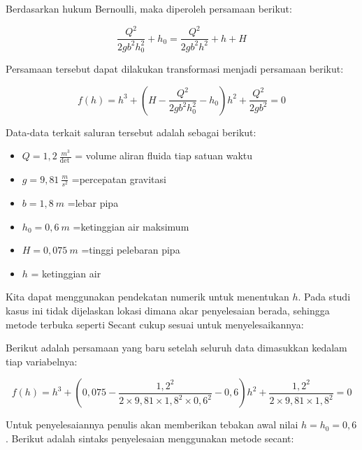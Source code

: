 \documentclass[]{book}
\providecommand{\tightlist}{%
  \setlength{\itemsep}{0pt}\setlength{\parskip}{0pt}}
\theoremstyle{definition}
\theoremstyle{definition}
\theoremstyle{definition}
\theoremstyle{remark}
\begin{document}
Berdasarkan hukum Bernoulli, maka diperoleh persamaan berikut:

\begin{equation}
\frac{Q^2}{2gb^2h_0^2}+h_0=\frac{Q^2}{2gb^2h^2}+h+H
  \label{eq:bernoullieq}
\end{equation}

Persamaan tersebut dapat dilakukan transformasi menjadi persamaan berikut:

\begin{equation}
f\left(h\right)=h^3+\left(H-\frac{Q^2}{2gb^2h_0^2}-h_0\right)h^2+\frac{Q^2}{2gb^2}=0
  \label{eq:bernoullieq2}
\end{equation}

Data-data terkait saluran tersebut adalah sebagai berikut:

\begin{itemize}
\tightlist
\item
  \(Q=1,2\ \frac{m^3}{\det\ }\) = volume aliran fluida tiap satuan waktu
\item
  \(g=9,81\ \frac{m}{s^2}\) =percepatan gravitasi
\item
  \(b=1,8\ m\) =lebar pipa
\item
  \(h_0=0,6\ m\) =ketinggian air maksimum
\item
  \(H=0,075\ m\) =tinggi pelebaran pipa
\item
  \(h\) = ketinggian air
\end{itemize}

Kita dapat menggunakan pendekatan numerik untuk menentukan \(h\). Pada studi kasus ini tidak dijelaskan lokasi dimana akar penyelesaian berada, sehingga metode terbuka seperti Secant cukup sesuai untuk menyelesaikannya:

Berikut adalah persamaan yang baru setelah seluruh data dimasukkan kedalam tiap variabelnya:

\[
f\left(h\right)=h^3+\left(0,075-\frac{1,2^2}{2\times9,81\times1,8^2\times0,6^2}-0,6\right)h^2+\frac{1,2^2}{2\times9,81\times1,8^2}=0
\]

Untuk penyelesaiannya penulis akan memberikan tebakan awal nilai \(h=h_0=0,6\). Berikut adalah sintaks penyelesaian menggunakan metode secant:
\end{document}
